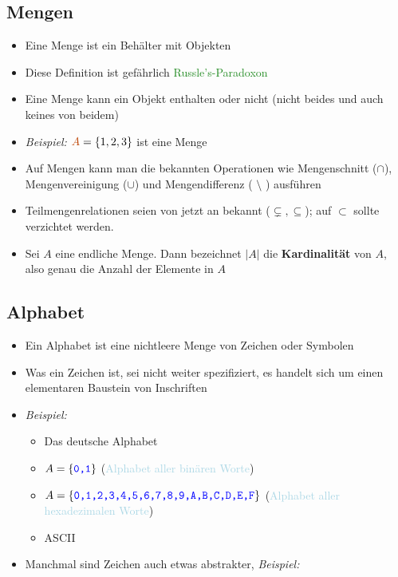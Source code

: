 \documentclass{article}
\newcommand{\blue}[1]{\textcolor{blue}{#1}}
\newcommand{\babyblue}[1]{\textcolor{lightblue}{#1}}
\newcommand{\strongColor}[1]{\textcolor{strongColor}{#1}}
\newcommand{\strong}[1]{\textbf{\strongColor{#1}}}
\newcommand{\verweis}[1]{\textcolor{ForestGreen}{#1}}
\newcommand{\example}[1]{\textit{Beispiel: }#1}
\newcommand{\word}[1]{\blue{\texttt{#1}}}
\newcommand{\interpretation}[1]{\babyblue{#1}}
\newcommand{\Fbox}[1]{\fbox{\strut#1}}
\newcommand*{\wordbox}[1]{\Fbox{#1}}
\begin{document}
\subsection{Mengen}
\begin{itemize}
    \item Eine Menge ist ein \dq Behälter\dq{} mit \dq Objekten\dq{}
    \item Diese Definition ist gefährlich \verweis{Russle's-Paradoxon}
    \item Eine Menge kann ein Objekt enthalten oder nicht (nicht beides und auch keines von beidem)
    \item \example{$\strongColor{A} = \{1,2,3\}$} ist eine Menge
    \item Auf Mengen kann man die bekannten Operationen wie Mengenschnitt ($\cap$), Mengenvereinigung ($\cup$) und Mengendifferenz ( $\setminus$ ) ausführen
    \item Teilmengenrelationen seien von jetzt an bekannt ($\subsetneq, \subseteq$); auf $\subset$ sollte verzichtet werden.
    \item Sei $A$ eine endliche Menge. Dann bezeichnet $|A|$ die \strong{Kardinalität} von $A$, also genau die Anzahl der Elemente in $A$
\end{itemize}

\subsection{Alphabet}
\begin{itemize}
    \item Ein Alphabet ist eine nichtleere Menge von Zeichen oder Symbolen
    \item Was ein Zeichen ist, sei nicht weiter spezifiziert, es handelt sich um einen elementaren Baustein von Inschriften
    \item \example{}
    \begin{itemize}
        \item Das deutsche Alphabet
        \item $A=\{\word{0,1}\}$ (\interpretation{Alphabet aller binären Worte})
        \item $A=\{\word{0,1,2,3,4,5,6,7,8,9,A,B,C,D,E,F}\}$ (\interpretation{Alphabet aller hexadezimalen Worte})
        \item ASCII
    \end{itemize}
    \item Manchmal sind Zeichen auch etwas abstrakter, \example{\word{\wordbox{int} \wordbox{counter} \wordbox{=} \wordbox{42} \wordbox{;}}}
\end{itemize}
\end{document}
